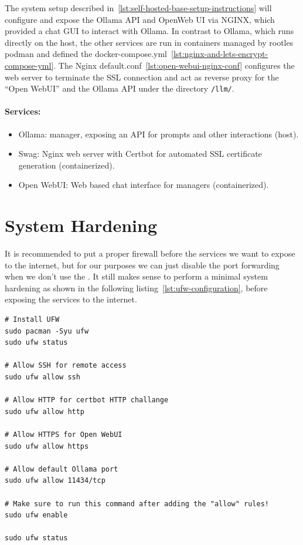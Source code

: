 The system setup described in~\ref{lst:self-hosted-base-setup-instructions} will configure and expose the Ollama \gls{API} and OpenWeb UI via NGINX,
which provided a chat \gls{GUI} to interact with Ollama.
In contrast to Ollama, which runs directly on the host, the other services are run in containers managed by rootles podman and defined the docker-compose.yml~\ref{lst:nginx-and-lets-encrypt-compose-yml}.
The \gls{Nginx} default.conf~\ref{lst:open-webui-nginx-conf} configures the web server to terminate the SSL connection and
act as reverse proxy for the \enquote{Open WebUI} and the Ollama \gls{API} under the directory \texttt{/llm/}.

\paragraph{Services:}
\begin{itemize}
    \item Ollama:  manager, exposing an \gls{API} for prompts and other interactions (host).
    \item Swag: \gls{Nginx} web server with Certbot for automated SSL certificate generation (containerized).
    \item Open WebUI: Web based chat interface for  managers (containerized).
\end{itemize}

\section{System Hardening}\label{sec:system_hardening}

It is recommended to put a proper firewall before the services we want to expose to the internet,
but for our purposes we can just disable the port forwarding when we don't use the .
It still makes sense to perform a minimal system hardening as shown in the following listing~\ref{lst:ufw-configuration},
before exposing the services to the internet.

\begin{listing}[H]
    \begin{verbatim}
# Install UFW
sudo pacman -Syu ufw
sudo ufw status

# Allow SSH for remote access
sudo ufw allow ssh

# Allow HTTP for certbot HTTP challange
sudo ufw allow http

# Allow HTTPS for Open WebUI
sudo ufw allow https

# Allow default Ollama port
sudo ufw allow 11434/tcp

# Make sure to run this command after adding the "allow" rules!
sudo ufw enable

sudo ufw status
    \end{verbatim}
    \caption{UFW configuration}
    \label{lst:ufw-configuration}
\end{listing}

